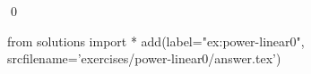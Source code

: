 
\begin{ex} 
  \label{ex:power-linear0}
  
  \qed
\end{ex} 
\begin{python0}
from solutions import *
add(label="ex:power-linear0",
    srcfilename='exercises/power-linear0/answer.tex') 
\end{python0}
